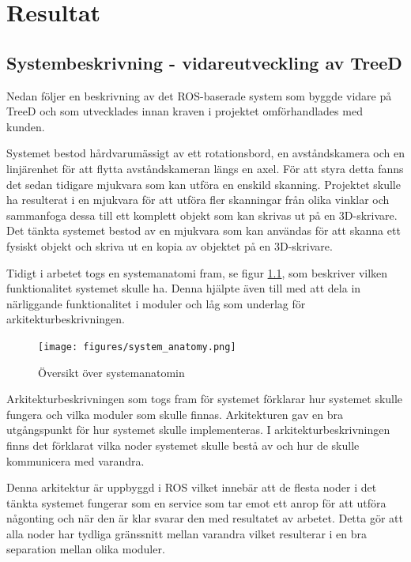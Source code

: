 \chapter{Resultat}
\label{cha:results}

\section{Systembeskrivning - vidareutveckling av TreeD}

Nedan följer en beskrivning av det ROS-baserade system som byggde vidare på TreeD och som utvecklades innan kraven i projektet omförhandlades med kunden.

Systemet bestod hårdvarumässigt av ett rotationsbord, en avståndskamera och en linjärenhet för att flytta avståndskameran längs en axel. För att styra detta fanns det sedan tidigare mjukvara som kan utföra en enskild skanning. Projektet skulle ha resulterat i en mjukvara för att utföra fler skanningar från olika vinklar och sammanfoga dessa till ett komplett objekt som kan skrivas ut på en 3D-skrivare. Det tänkta systemet bestod av en mjukvara som kan användas för att skanna ett fysiskt objekt och skriva ut en kopia av objektet på en 3D-skrivare.

Tidigt i arbetet togs en systemanatomi fram, se figur \ref{fig:system_anatomy}, som beskriver vilken funktionalitet systemet skulle ha. Denna hjälpte även till med att dela in närliggande funktionalitet i moduler och låg som underlag för arkitekturbeskrivningen.

\begin{figure}[H]
	\centering
	\texttt{[image: figures/system\_anatomy.png]}
	\caption{Översikt över systemanatomin}
	\label{fig:system_anatomy}
\end{figure}


Arkitekturbeskrivningen som togs fram för systemet förklarar hur systemet skulle fungera och vilka moduler som skulle finnas. Arkitekturen gav en bra utgångspunkt för hur systemet skulle implementeras. I arkitekturbeskrivningen finns det förklarat vilka noder systemet skulle bestå av och hur de skulle kommunicera med varandra.

Denna arkitektur är uppbyggd i ROS vilket innebär att de flesta noder i det tänkta systemet fungerar som en service som tar emot ett anrop för att utföra någonting och när den är klar svarar den med resultatet av arbetet. Detta gör att alla noder har tydliga gränssnitt mellan varandra vilket resulterar i en bra separation mellan olika moduler.

